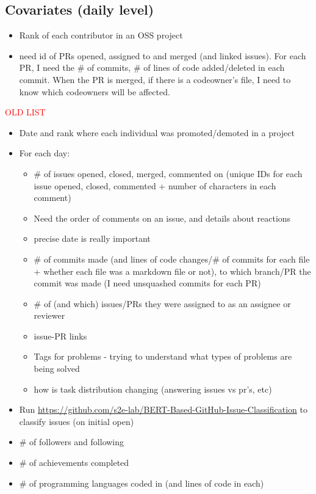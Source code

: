 \documentclass[12pt,notitlepage]{article}
\begin{document}
\subsection*{Covariates (daily level)}
\begin{itemize}
    \item Rank of each contributor in an OSS project 
    \item need id of PRs opened, assigned to and merged (and linked issues). For each PR, I need the \# of commits, \# of lines of code added/deleted in each commit. When the PR is merged, if there is a codeowner's file, I need to know which codeowners will be affected. 
\end{itemize}

\textcolor{red}{OLD LIST}
\begin{itemize}
    \item Date and rank where each individual was promoted/demoted in a project
    \item For each day:
    \begin{itemize}
        \item \# of issues opened, closed, merged, commented on (unique IDs for each issue opened, closed, commented + number of characters in each comment)
        \item Need the order of comments on an issue, and details about reactions
        \item precise date is really important 
        \item \# of commits made (and lines of code changes/\# of commits for each file + whether each file was a markdown file or not), to which branch/PR the commit was made (I need unsquashed commits for each PR)
        \item \# of (and which) issues/PRs they were assigned to as an assignee or reviewer
        \item issue-PR links
        \item Tags for problems - trying to understand what types of problems are being solved
        \item how is task distribution changing (answering issues vs pr's, etc)
    \end{itemize}
    \item Run \url{https://github.com/s2e-lab/BERT-Based-GitHub-Issue-Classification} to classify issues (on initial open)
    \item \# of followers and following
    \item \# of achievements completed
    \item \# of programming languages coded in (and lines of code in each) 

\end{itemize}
\end{document}
